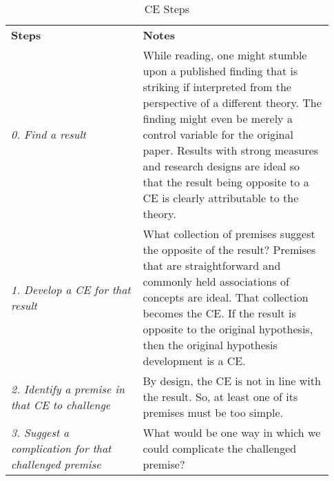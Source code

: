 \documentclass[authordate, meta]{jote-new-article}
\begin{document}
\begin{table}[t!]
  \begin{fullwidth}
    \caption{CE Steps}
    \label{tab:3}

    \begin{tabularx}{\columnwidth}{@{}>{\RaggedRight\arraybackslash}p{0.38\linewidth} >{\RaggedRight\arraybackslash}p{0.55\linewidth}@{}}

      \textbf{Steps}                                                               & \textbf{Notes}                                                                                                                                                                                                                                                                                    \\
      \emph{0. Find a result}                                                      & While reading, one might stumble upon a published finding that is striking if interpreted from the perspective of a different theory. The finding might even be merely a control variable for the original paper.
      \newline Results with strong measures and research designs are ideal so that the result being opposite to a CE is clearly attributable to the theory.                                                                                                                                                                                                                            \\
      \emph{1. Develop a CE for that result}                                       & What collection of premises suggest the opposite of the result? Premises that are  straightforward and commonly held  associations of concepts are ideal. That collection becomes the CE. If the result is opposite to the original hypothesis, then the original hypothesis development is a CE. \\
      \emph{2. Identify a premise in that CE to challenge}                         & By design, the CE is not in line with the result. So, at least one of its premises must be too simple.                                                                                                                                                                                            \\
      \emph{3. Suggest a complication for that challenged premise}                 & What would be one way in which we could complicate the challenged premise?                                                                                                                                                                                                                        \\

\end{tabularx}
\end{fullwidth}
\end{table}
\end{document}
